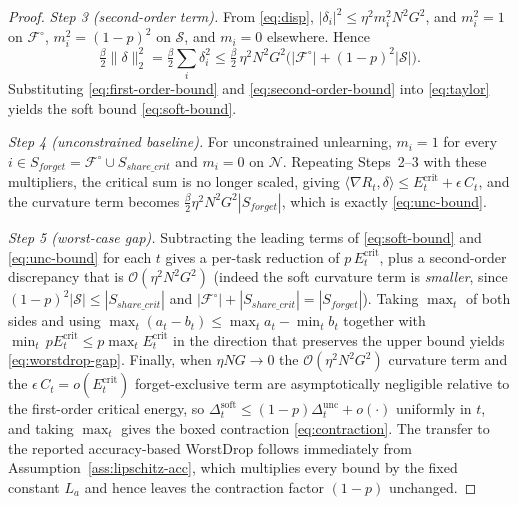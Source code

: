 \begin{proof}
\emph{Step 3 (second-order term).}
From \eqref{eq:disp}, $|\delta_{i}|^{2}\le \eta^{2}m_{i}^{2}N^{2}G^{2}$,
and $m_{i}^{2}=1$ on $\mathcal{F}^{\!\circ}$, $m_{i}^{2}=(1-p)^{2}$ on
$\mathcal{S}$, and $m_{i}=0$ elsewhere. Hence
\begin{equation}
\label{eq:second-order-bound}
\tfrac{\beta}{2}\|\delta\|_{2}^{2}
=\tfrac{\beta}{2}\sum_{i}\delta_{i}^{2}
\le\tfrac{\beta}{2}\,\eta^{2}N^{2}G^{2}
\Big(|\mathcal{F}^{\!\circ}|+(1-p)^{2}|\mathcal{S}|\Big).
\end{equation}
Substituting \eqref{eq:first-order-bound} and
\eqref{eq:second-order-bound} into \eqref{eq:taylor} yields the soft
bound \eqref{eq:soft-bound}.

\emph{Step 4 (unconstrained baseline).}
For unconstrained unlearning, $m_{i}=1$ for every
$i\in S_{forget}=\mathcal{F}^{\!\circ}\cup S_{share\_crit}$ and
$m_{i}=0$ on $\mathcal{N}$. Repeating Steps~2--3 with these
multipliers, the critical sum is no longer scaled, giving
$\langle\nabla R_{t},\delta\rangle\le E^{\mathrm{crit}}_{t}+\epsilon\,C_{t}$,
and the curvature term becomes
$\tfrac{\beta}{2}\eta^{2}N^{2}G^{2}|S_{forget}|$, which is exactly
\eqref{eq:unc-bound}.

\emph{Step 5 (worst-case gap).}
Subtracting the leading terms of \eqref{eq:soft-bound} and
\eqref{eq:unc-bound} for each $t$ gives a per-task reduction of
$p\,E^{\mathrm{crit}}_{t}$, plus a second-order discrepancy that is
$\mathcal{O}(\eta^{2}N^{2}G^{2})$ (indeed the soft curvature term is
\emph{smaller}, since $(1-p)^{2}|\mathcal{S}|\le|S_{share\_crit}|$ and
$|\mathcal{F}^{\!\circ}|+|S_{share\_crit}|=|S_{forget}|$). Taking
$\max_{t}$ of both sides and using
$\max_t(a_t-b_t)\le\max_t a_t-\min_t b_t$ together with
$\min_t\,p E^{\mathrm{crit}}_t \le p\max_t E^{\mathrm{crit}}_t$ in the
direction that preserves the upper bound yields
\eqref{eq:worstdrop-gap}. Finally, when $\eta NG\to 0$ the
$\mathcal{O}(\eta^{2}N^{2}G^{2})$ curvature term and the
$\epsilon\,C_{t}=o(E^{\mathrm{crit}}_{t})$ forget-exclusive term are
asymptotically negligible relative to the first-order critical energy,
so $\Delta_{t}^{\mathrm{soft}}\le(1-p)\Delta_{t}^{\mathrm{unc}}+o(\cdot)$
uniformly in $t$, and taking $\max_t$ gives the boxed contraction
\eqref{eq:contraction}. The transfer to the reported accuracy-based
WorstDrop follows immediately from Assumption~\ref{ass:lipschitz-acc},
which multiplies every bound by the fixed constant $L_{a}$ and hence
leaves the contraction factor $(1-p)$ unchanged.
\end{proof}

